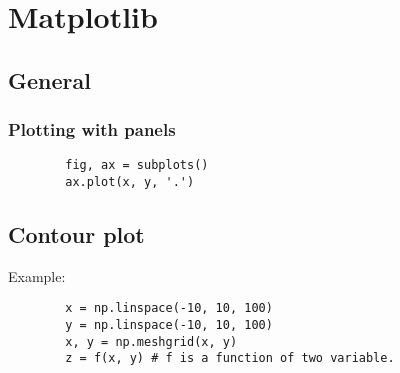 \section{Matplotlib}

\subsection{General}
\subsubsection*{Plotting with panels}
\begin{mdframed}[backgroundcolor=gray!10,linecolor=Firebrick4]
    \begin{verbatim}
        fig, ax = subplots()
        ax.plot(x, y, '.')
    \end{verbatim}
\end{mdframed}


\subsection{Contour plot}
Example:\\
\begin{mdframed}[backgroundcolor=gray!10,linecolor=Firebrick4]
    \begin{verbatim}
        x = np.linspace(-10, 10, 100) 
        y = np.linspace(-10, 10, 100)
        x, y = np.meshgrid(x, y)
        z = f(x, y) # f is a function of two variable.

    \end{verbatim}
\end{mdframed}